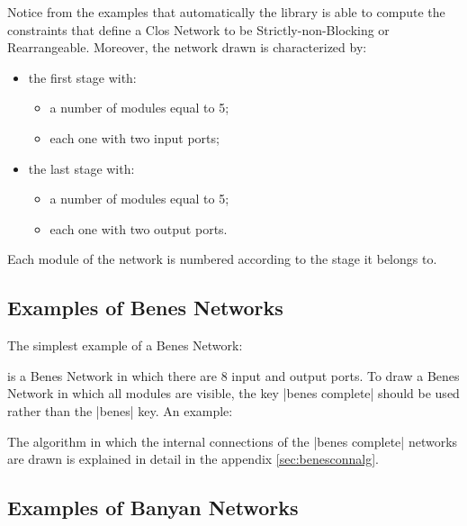 \documentclass{ltxdoc}
\begin{document}
Notice from the examples that automatically the library is able to compute the constraints that define a Clos Network to be Strictly-non-Blocking or Rearrangeable. Moreover, the network drawn is characterized by:
\begin{itemize}
\item the first stage with:
\begin{itemize}
\item a number of modules equal to 5;
\item each one with two input ports;
\end{itemize}
\item the last stage with:
\begin{itemize}
\item a number of modules equal to 5;
\item each one with two output ports.
\end{itemize}
\end{itemize}
Each module of the network is numbered according to the stage it belongs to.

\subsection{Examples of Benes Networks}

The simplest example of a Benes Network:
\begin{codeexample}[]
\begin{tikzpicture}
    \node[benes] {};
\end{tikzpicture}
\end{codeexample}
is a Benes Network in which there are 8 input and output ports. To draw a Benes Network in which all modules are visible, the key |benes complete| should be used rather than the |benes| key. An example:

\begin{codeexample}[]
\end{codeexample}

The algorithm in which the internal connections of the |benes complete| networks are drawn is explained in detail in the appendix \ref{sec:benesconnalg}.

\subsection{Examples of Banyan Networks}
\end{document}
